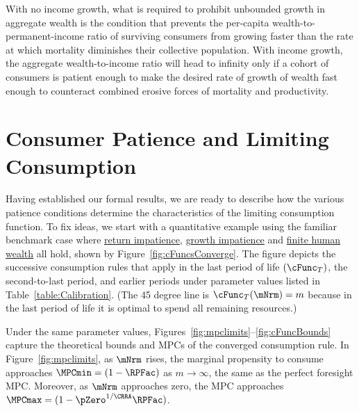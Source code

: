 \documentclass[BufferStockTheory]{subfiles}
\begin{document}
With no income growth, what is required to prohibit unbounded growth in aggregate wealth is the condition that prevents the per-capita wealth-to-permanent-income ratio of surviving consumers from growing faster than the rate at which mortality diminishes their collective population.
With income growth, the aggregate wealth-to-income ratio will head to infinity only if a cohort of consumers is patient enough to make the desired rate of growth of wealth fast enough to counteract combined erosive forces of mortality and productivity.

\hypertarget{Discussion-Growth-Impatience}{}
\section{Consumer Patience and Limiting Consumption}\label{sec:GICdiscussion}

\renewcommand{\figName}{cFuncsConverge} 
 

Having established our formal results, we are ready to describe how the various patience conditions determine the characteristics of the limiting consumption function.
To fix ideas, we start with a quantitative example using the familiar benchmark case where \hyperlink{RIC}{return impatience}, \hyperlink{GIC}{growth impatience} and \hyperlink{FHWC}{finite human wealth} all hold, shown by Figure~\ref{fig:cFuncsConverge}.
The figure depicts the successive consumption rules that apply in the last period of life $(\cFunc_{T})$, the second-to-last period, and earlier periods under parameter values listed in Table~\ref{table:Calibration}.
(The 45 degree line is $\cFunc_{T}(\mNrm) = m$ because in the last period of life it is optimal to spend all remaining resources.)

Under the same parameter values, Figures~\ref{fig:mpclimits}--\ref{fig:cFuncBounds} capture the theoretical bounds and MPCs of the converged consumption rule.
In Figure~\ref{fig:mpclimits}, as $\mNrm$ rises, the marginal propensity to consume approaches $\MPCmin=(1-\RPFac)$ as $m \rightarrow \infty$, the same as the perfect foresight MPC.
Moreover, as $\mNrm$ approaches zero, the MPC approaches $\MPCmax=(1-\pZero^{1/\CRRA}\RPFac)$.


\renewcommand{\figFile}{mpclimits}
\hypertarget{\figFile}{}

\renewcommand{\figFile}{cFuncBounds}
\hypertarget{\figFile}{}

\end{document}
